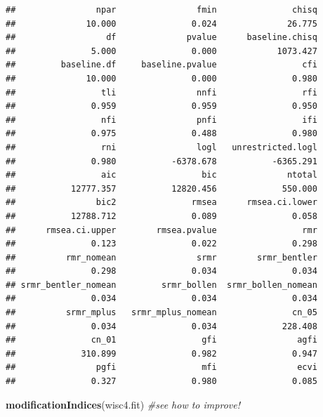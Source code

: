 \documentclass[]{book}
\newenvironment{Shaded}{\begin{snugshade}}{\end{snugshade}}
\newcommand{\KeywordTok}[1]{\textcolor[rgb]{0.13,0.29,0.53}{\textbf{#1}}}
\newcommand{\CommentTok}[1]{\textcolor[rgb]{0.56,0.35,0.01}{\textit{#1}}}
\newcommand{\NormalTok}[1]{#1}
\theoremstyle{definition}
\theoremstyle{definition}
\theoremstyle{definition}
\theoremstyle{remark}
\begin{document}
\begin{verbatim}
##                npar                fmin               chisq 
##              10.000               0.024              26.775 
##                  df              pvalue      baseline.chisq 
##               5.000               0.000            1073.427 
##         baseline.df     baseline.pvalue                 cfi 
##              10.000               0.000               0.980 
##                 tli                nnfi                 rfi 
##               0.959               0.959               0.950 
##                 nfi                pnfi                 ifi 
##               0.975               0.488               0.980 
##                 rni                logl   unrestricted.logl 
##               0.980           -6378.678           -6365.291 
##                 aic                 bic              ntotal 
##           12777.357           12820.456             550.000 
##                bic2               rmsea      rmsea.ci.lower 
##           12788.712               0.089               0.058 
##      rmsea.ci.upper        rmsea.pvalue                 rmr 
##               0.123               0.022               0.298 
##          rmr_nomean                srmr        srmr_bentler 
##               0.298               0.034               0.034 
## srmr_bentler_nomean         srmr_bollen  srmr_bollen_nomean 
##               0.034               0.034               0.034 
##          srmr_mplus   srmr_mplus_nomean               cn_05 
##               0.034               0.034             228.408 
##               cn_01                 gfi                agfi 
##             310.899               0.982               0.947 
##                pgfi                 mfi                ecvi 
##               0.327               0.980               0.085
\end{verbatim}

\begin{Shaded}
\begin{Highlighting}[]
\KeywordTok{modificationIndices}\NormalTok{(wisc4.fit) }\CommentTok{#see how to improve!   }
\end{Highlighting}
\end{Shaded}
\end{document}
